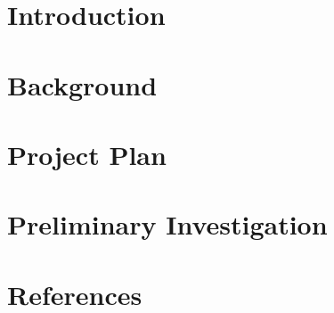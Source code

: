 





\section{Introduction}




\section{Background}



\section{Project Plan}



\section{Preliminary Investigation}




\newpage

\section{References}

\printbibliography[heading=none]





